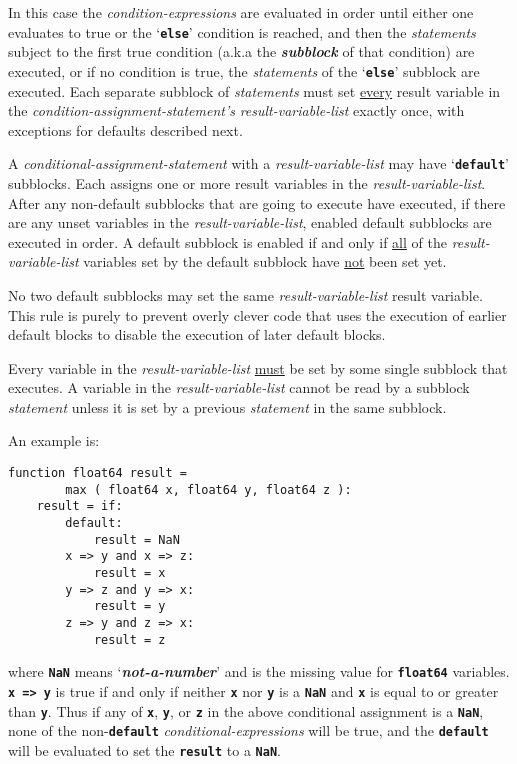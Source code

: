\documentclass[12pt]{article}
\makeatletter
\newcommand{\TT}[1]{{\tt \bfseries #1}}
\newcommand{\key}[1]{{\bf \em #1}\index{#1}}
\newcommand{\ttkey}[1]{\TT{#1}\index{#1@{\tt #1}}}
\newenvironment{indpar}[1][0.3in]%
	{\begin{list}{}%
		     {\setlength{\itemsep}{0in}%
		      \setlength{\topsep}{0in}%
		      \setlength{\parsep}{1ex}%
		      \setlength{\labelwidth}{#1}%
		      \setlength{\leftmargin}{#1}%
		      \addtolength{\leftmargin}{\labelsep}}%
	 \item}%
	{\end{list}}
\makeatother
\begin{document}
In this case the {\em condition-expressions} are evaluated in order
until either one evaluates to true or the `\TT{else}' condition is
reached, and then the {\em statements} subject to the
first true condition (a.k.a the \key{subblock} of that condition)
are executed, or if no condition is true, the {\em statements}
of the `\TT{else}' subblock are executed.  Each separate subblock of
{\em statements} must set \underline{every} result variable
in the {\em condition-assignment-statement's} {\em result-variable-list} exactly
once, with exceptions for defaults described next.

A {\em conditional-assignment-statement} with a
{\em result-variable-list} may have
`\ttkey{default}\TT{:}' subblocks.  Each assigns one or more result
variables in the {\em result-variable-list}.  After any non-default subblocks
that are going to execute have executed, if there are any unset
variables in the {\em result-variable-list},
enabled default subblocks are executed
in order.  A default subblock is enabled if and
only if \underline{all} of the
{\em result-variable-list} variables set by the default subblock have
\underline{not} been set yet.

No two default subblocks may set the same {\em result-variable-list}
result variable.  This rule is purely to prevent overly clever code that
uses the execution of earlier default blocks to disable the
execution of later default blocks.

Every variable in the {\em result-variable-list} \underline{must} be set by some
single subblock that executes.  A variable in the
{\em result-variable-list} cannot be read by a subblock {\em statement}
unless it is set by a previous {\em statement} in the
same subblock.

An example is:
\begin{indpar}\begin{verbatim}
function float64 result =
        max ( float64 x, float64 y, float64 z ):
    result = if:
        default:
            result = NaN
        x => y and x => z:
            result = x
        y => z and y => x:
            result = y
        z => y and z => x:
            result = z
\end{verbatim}\end{indpar}

where \TT{NaN} means `\key{not-a-number}' and is the missing
value for \TT{float64} variables.  \TT{x~=>~y} is true if
and only if neither \TT{x} nor \TT{y} is a \TT{NaN} and
\TT{x} is equal to or greater than \TT{y}.  Thus if any of
\TT{x}, \TT{y}, or \TT{z} in the above conditional assignment
is a \TT{NaN}, none of the non-\TT{default} {\em conditional-expressions}
will be true, and the \TT{default} will be evaluated to set
the \TT{result} to a \TT{NaN}.
\end{document}

